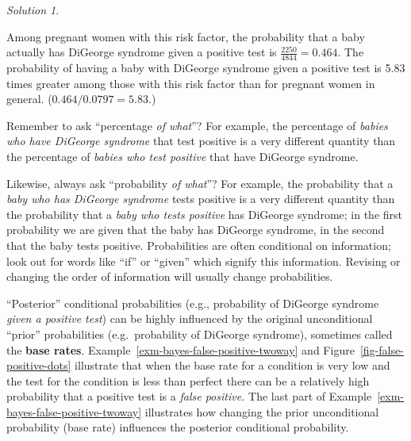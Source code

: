 \documentclass[
  letterpaper,
  DIV=11,
  numbers=noendperiod]{scrreprt}
\theoremstyle{plain}
\theoremstyle{definition}
\theoremstyle{definition}
\theoremstyle{definition}
\theoremstyle{remark}
\newtheorem{refsolution}{Solution}[chapter]
\begin{document}
\begin{tcolorbox}
\begin{refsolution}
\begin{enumerate}
  Among pregnant women with this risk factor, the probability that a
  baby actually has DiGeorge syndrome given a positive test is
  \(\frac{2250}{4844} = 0.464\). The probability of having a baby with
  DiGeorge syndrome given a positive test is 5.83 times greater among
  those with this risk factor than for pregnant women in general.
  (\(0.464 / 0.0797 = 5.83\).)
\end{enumerate}

\label{sol-bayes-false-positive-twoway}

\end{refsolution}

\end{tcolorbox}


Remember to ask ``percentage \emph{of what}''? For example, the
percentage of \emph{babies who have DiGeorge syndrome} that test
positive is a very different quantity than the percentage of
\emph{babies who test positive} that have DiGeorge syndrome.

Likewise, always ask ``probability \emph{of what}''? For example, the
probability that a \emph{baby who has DiGeorge syndrome} tests positive
is a very different quantity than the probability that a \emph{baby who
tests positive} has DiGeorge syndrome; in the first probability we are
given that the baby has DiGeorge syndrome, in the second that the baby
tests positive. Probabilities are often conditional on information; look
out for words like ``if'' or ``given'' which signify this information.
Revising or changing the order of information will usually change
probabilities.

``Posterior'' conditional probabilities (e.g., probability of DiGeorge
syndrome \emph{given a positive test}) can be highly influenced by the
original unconditional ``prior'' probabilities (e.g.~probability of
DiGeorge syndrome), sometimes called the \textbf{base rates}.
Example~\ref{exm-bayes-false-positive-twoway} and
Figure~\ref{fig-false-positive-dots} illustrate that when the base rate
for a condition is very low and the test for the condition is less than
perfect there can be a relatively high probability that a positive test
is a \emph{false positive.} The last part of
Example~\ref{exm-bayes-false-positive-twoway} illustrates how changing
the prior unconditional probability (base rate) influences the posterior
conditional probability.
\end{document}
